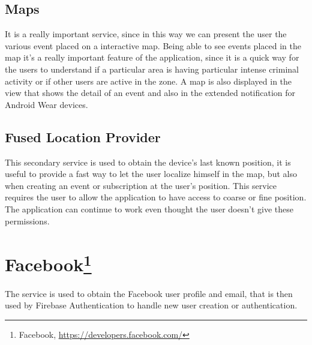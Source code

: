 \documentclass[a4paper]{scrreprt}
\begin{document}
\subsection{Maps}
It is a really important service, since in this way we can present the user the various event placed on a interactive map. Being able to see events placed in the map it's a really important feature of the application, since it is a quick way for the users to understand if a particular area is having particular intense criminal activity or if other users are active in the zone. A map is also displayed in the view that shows the detail of an event and also in the extended notification for Android Wear devices.

\subsection{Fused Location Provider}
This secondary service is used to obtain the device's last known position, it is useful to provide a fast way to let the user localize himself in the map, but also when creating an event or subscription at the user's position. This service requires the user to allow the application to have access to coarse or fine position. The application can continue to work even thought the user doesn't give these permissions.

\section[Facebook]{Facebook\footnote{Facebook, \url{https://developers.facebook.com/}}}
The service is used to obtain the Facebook user profile and email, that is then used by Firebase Authentication to handle new user creation or authentication.
\end{document}
